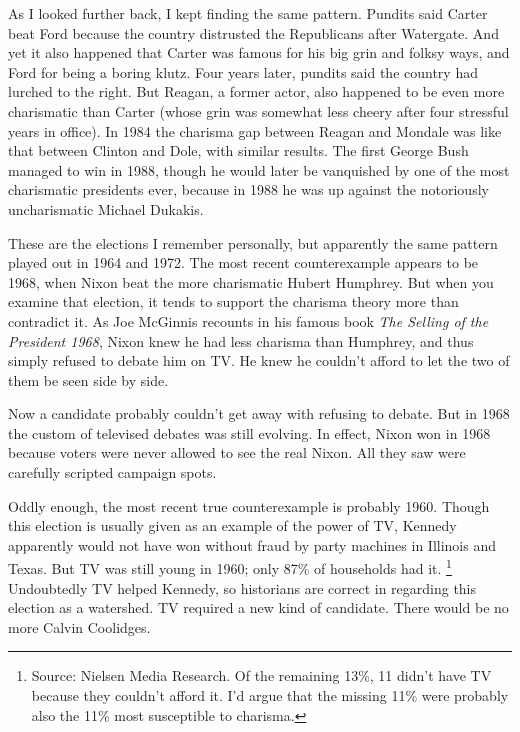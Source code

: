 As I looked further back, I kept finding the same pattern. Pundits said
Carter beat Ford because the country distrusted the Republicans after
Watergate. And yet it also happened that Carter was famous for his big
grin and folksy ways, and Ford for being a boring klutz. Four years
later, pundits said the country had lurched to the right. But Reagan, a
former actor, also happened to be even more charismatic than Carter
(whose grin was somewhat less cheery after four stressful years in
office). In 1984 the charisma gap between Reagan and Mondale was like
that between Clinton and Dole, with similar results. The first George
Bush managed to win in 1988, though he would later be vanquished by one
of the most charismatic presidents ever, because in 1988 he was up
against the notoriously uncharismatic Michael Dukakis.

These are the elections I remember personally, but apparently the same
pattern played out in 1964 and 1972. The most recent counterexample
appears to be 1968, when Nixon beat the more charismatic Hubert
Humphrey. But when you examine that election, it tends to support the
charisma theory more than contradict it. As Joe McGinnis recounts in his
famous book \emph{The Selling of the President 1968}, Nixon knew he had
less charisma than Humphrey, and thus simply refused to debate him on
TV. He knew he couldn't afford to let the two of them be seen side by
side.

Now a candidate probably couldn't get away with refusing to debate. But
in 1968 the custom of televised debates was still evolving. In effect,
Nixon won in 1968 because voters were never allowed to see the real
Nixon. All they saw were carefully scripted campaign spots.

Oddly enough, the most recent true counterexample is probably 1960.
Though this election is usually given as an example of the power of TV,
Kennedy apparently would not have won without fraud by party machines in
Illinois and Texas. But TV was still young in 1960; only 87\% of
households had it. \footnote{Source: Nielsen Media Research. Of the remaining 13\%, 11 didn't
have TV because they couldn't afford it. I'd argue that the missing 11\%
were probably also the 11\% most susceptible to charisma.} Undoubtedly TV helped
Kennedy, so historians are correct in regarding this election as a
watershed. TV required a new kind of candidate. There would be no more
Calvin Coolidges.

